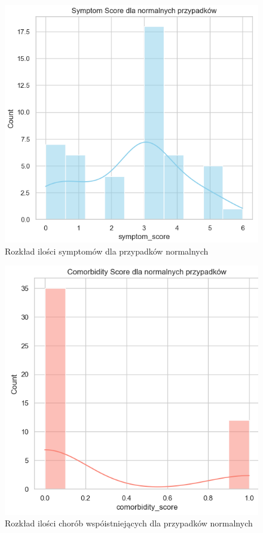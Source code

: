 \documentclass[a4paper,fleqn]{cas-dc}
\begin{document}
\begin{figure}[h]
	\includegraphics[scale=.73]{wykresy/wykres3.1.png}
	\caption{Rozkład ilości symptomów dla przypadków normalnych}
	\label{FIG:1}
\end{figure}

\begin{figure}[h]
	\includegraphics[scale=.73]{wykresy/wykres3.2.png}
	\caption{Rozkład ilości chorób wspóistniejących dla przypadków normalnych}
	\label{FIG:1}
\end{figure}
\end{document}
